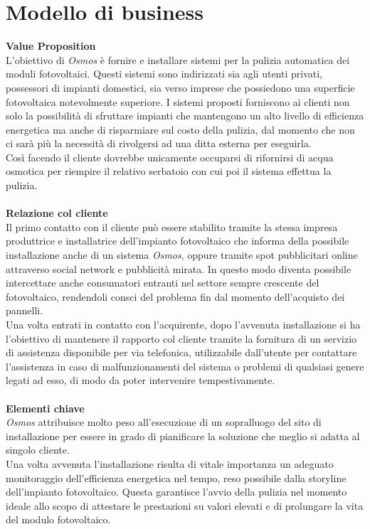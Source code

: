 \documentclass[a4paper, 12pt]{article}
\begin{document}
	\section{Modello di business}
	\textbf{Value Proposition}\\
	L'obiettivo di \emph{Osmos} è fornire e installare sistemi per la pulizia automatica dei moduli fotovoltaici. Questi sistemi sono indirizzati sia agli utenti privati, possessori di impianti domestici, sia verso imprese che possiedono una superficie fotovoltaica notevolmente superiore. I sistemi proposti forniscono ai clienti non solo la possibilità di sfruttare impianti che mantengono un alto livello di efficienza energetica ma anche di risparmiare sul costo della pulizia, dal momento che non ci sarà più la necessità di rivolgersi ad una ditta esterna per eseguirla.\\
	Così facendo il cliente dovrebbe unicamente occuparsi di rifornirsi di acqua osmotica per riempire il relativo serbatoio con cui poi il sistema effettua la pulizia.\\\\
	\textbf{Relazione col cliente}\\
	Il primo contatto con il cliente può essere stabilito tramite la stessa impresa produttrice e installatrice dell'impianto fotovoltaico che informa della possibile installazione anche di un sistema \emph{Osmos}, oppure tramite spot pubblicitari online attraverso social network e pubblicità mirata. In questo modo diventa possibile intercettare anche consumatori entranti nel settore sempre crescente del fotovoltaico, rendendoli consci del problema fin dal momento dell'acquisto dei pannelli.\\
	Una volta entrati in contatto con l'acquirente, dopo l'avvenuta installazione si ha l'obiettivo di mantenere il rapporto col cliente tramite la fornitura di un servizio di assistenza disponibile per via telefonica, utilizzabile dall'utente per contattare l'assistenza in caso di malfunzionamenti del sistema o problemi di qualsiasi genere legati ad esso, di modo da poter intervenire tempestivamente.\\\\
	\textbf{Elementi chiave}\\
	\emph{Osmos} attribuisce molto peso all'esecuzione di un sopralluogo del sito di installazione per essere in grado di pianificare la soluzione che meglio si adatta al singolo cliente.\\
	Una volta avvenuta l'installazione risulta di vitale importanza un adeguato monitoraggio dell'efficienza energetica nel tempo, reso possibile dalla storyline dell'impianto fotovoltaico. Questa garantisce l'avvio della pulizia nel momento ideale allo scopo di attestare le prestazioni su valori elevati e di prolungare la vita del modulo fotovoltaico.\\
\end{document}
